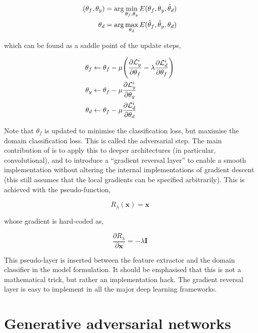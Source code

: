 \begin{align}
(\theta_f, \theta_y) &= \arg\min_{\theta_f, \theta_y} E(\theta_f, \theta_y, \hat{\theta}_d) \notag \\
\theta_d &= \arg\max_{\theta_d} E(\hat{\theta}_f, \hat{\theta}_y, \theta_d)
\end{align}

which can be found as a saddle point of the update steps,

\begin{align}
\theta_f &\leftarrow \theta_f - \mu\Bigg(\frac{\partial \mathcal{L}_y^i}{\partial\theta_f} - \lambda\frac{\partial \mathcal{L}_d^i}{\partial\theta_f}\Bigg) \notag \\
\theta_y &\leftarrow \theta_f - \mu\frac{\partial \mathcal{L}_y^i}{\partial\theta_y} \notag \\
\theta_d &\leftarrow \theta_f - \mu\frac{\partial \mathcal{L}_d^i}{\partial\theta_d}
\end{align}

Note that $\theta_f$ is updated to minimise the classification loss, but maximise the domain classification loss. This is called the adversarial step. The main contribution of \cite{ganin2014unsupervised} is to apply this to deeper architectures (in particular, convolutional), and to introduce a ``gradient reversal layer'' to enable a smooth implementation without altering the internal implementations of gradient descent (this still assumes that the local gradients can be specified arbitrarily). This is achieved with the pseudo-function,

\begin{equation}
R_\lambda(\mathbf{x}) = \mathbf{x}
\end{equation}

whose gradient is hard-coded as,

\begin{equation}
\frac{\partial R_\lambda}{\partial\mathbf{x}} = -\lambda\mathbf{I}
\end{equation}

This pseudo-layer is inserted between the feature extractor and the domain classifier in the model formulation. It should be emphasised that this is not a mathematical trick, but rather an implementation hack. The gradient reversal layer is easy to implement in all the major deep learning frameworks.

\section{Generative adversarial networks}

